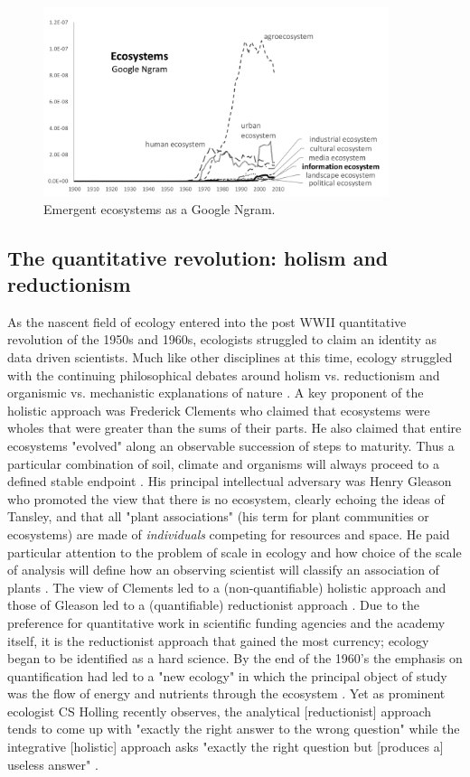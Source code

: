 \begin{figure}[!ht]
  \centering
    \includegraphics[width=0.9\textwidth]{figures/ecosystemsAll}
  \caption{Emergent ecosystems as a Google Ngram.}
\end{figure}

\subsection{The quantitative revolution: holism and reductionism}
As the nascent field of ecology entered into the post WWII quantitative revolution of the 1950s and 1960s, ecologists struggled to claim an identity as data driven scientists. Much like other disciplines at this time, ecology struggled with the continuing philosophical debates around holism vs. reductionism and organismic vs. mechanistic explanations of nature \cite{barbour_1996}. A key proponent of the holistic approach was Frederick Clements who claimed that ecosystems were wholes that were greater than the sums of their parts. He also claimed that entire ecosystems "evolved" along an observable succession of steps to maturity. Thus a particular combination of soil, climate and organisms will always proceed to a defined stable endpoint \cite{clements_1936}. His principal intellectual adversary was Henry Gleason who promoted the view that there is no ecosystem, clearly echoing the ideas of Tansley, and that all "plant associations" (his term for plant communities or ecosystems) are made of \textit{individuals} competing for resources and space. He paid particular attention to the problem of scale in ecology and how choice of the scale of analysis will define how an observing scientist will classify an association of plants \cite{gleason_1939}. The view of Clements led to a (non-quantifiable) holistic approach and those of Gleason led to a (quantifiable) reductionist approach \cite{barbour_1996,worster_1977}. Due to the preference for quantitative work in scientific funding agencies and the academy itself, it is the reductionist approach that gained the most currency; ecology began to be identified as a hard science. By the end of the 1960's the emphasis on quantification had led to a "new ecology" in which the principal object of study was the flow of energy and nutrients through the ecosystem \cite{worster_1977, barbour_1996}.  Yet as prominent ecologist CS Holling recently observes, the analytical [reductionist] approach tends to come up with "exactly the right answer to the wrong question" while the integrative [holistic] approach asks "exactly the right question but [produces a] useless answer" \cite[][p. 3]{holling_1998}.

